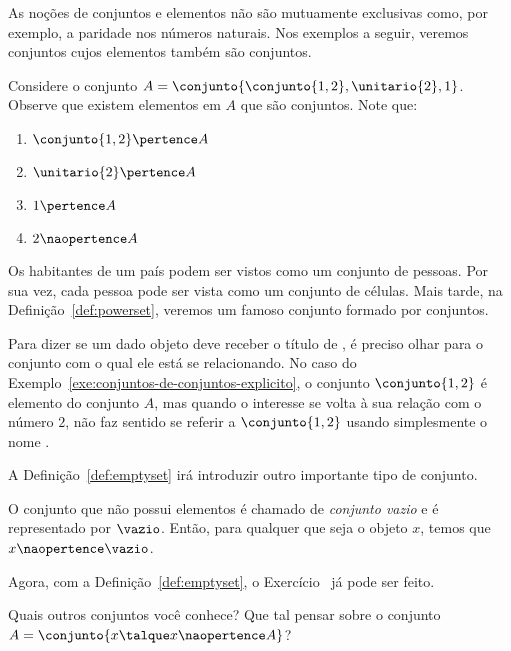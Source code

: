 As noções de conjuntos e elementos não são mutuamente exclusivas como, por exemplo, a paridade nos números naturais. Nos exemplos a seguir, veremos conjuntos cujos elementos também são conjuntos.

\begin{example}
    \label{exe:conjuntos-de-conjuntos-explicito}
    Considere o conjunto $A = \conjunto{\conjunto{1, 2},\unitario{2}, 1}$. Observe que existem elementos em $A$ que são conjuntos. Note que:
    \begin{enumerate}
        \item $\conjunto{1, 2} \pertence A$
        \item $\unitario{2} \pertence A$
        \item $1 \pertence A$
        \item $2 \naopertence A$
    \end{enumerate}
\end{example}

\begin{example}
    \label{exe:conjuntos-de-conjuntos-implicito}
    Os habitantes de um país podem ser vistos como um conjunto de pessoas. Por sua vez, cada pessoa pode ser vista como um conjunto de células. Mais tarde, na Definição~\ref{def:powerset}, veremos um famoso conjunto formado por conjuntos.
\end{example}

Para dizer se um dado objeto deve receber o título de , é preciso olhar para o conjunto com o qual ele está se relacionando. No caso do Exemplo~\ref{exe:conjuntos-de-conjuntos-explicito}, o conjunto $\conjunto{1, 2}$ é elemento do conjunto $A$, mas quando o interesse se volta à sua relação com o número $2$, não faz sentido se referir a $\conjunto{1, 2}$ usando simplesmente o nome .

A Definição~\ref{def:emptyset} irá introduzir outro importante tipo de conjunto.

\begin{definition}
    \label{def:emptyset} %
    O conjunto que não possui elementos é chamado de \emph{conjunto vazio} e é representado por $\vazio$. Então, para qualquer que seja o objeto $x$, temos que $x \naopertence \vazio$.
\end{definition}

Agora, com a Definição~\ref{def:emptyset}, o Exercício~ já pode ser feito.

\begin{example}
    Quais outros conjuntos você conhece? Que tal pensar sobre o conjunto $A = \conjunto{ x \talque x \naopertence A}$?
\end{example}
